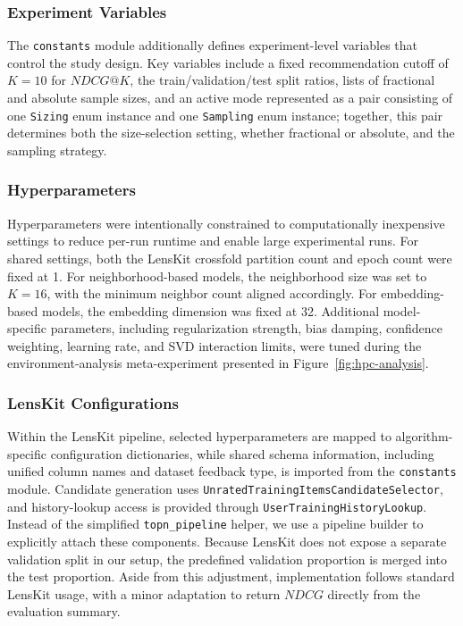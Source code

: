 \documentclass[12pt,a4paper]{article}
\begin{document}
\subsubsection{Experiment Variables}
The \texttt{constants} module additionally defines experiment-level variables that control the study design. Key variables include a fixed recommendation cutoff of $K=10$ for $NDCG@K$, the train/validation/test split ratios, lists of fractional and absolute sample sizes, and an active mode represented as a pair consisting of one \texttt{Sizing} enum instance and one \texttt{Sampling} enum instance; together, this pair determines both the size-selection setting, whether fractional or absolute, and the sampling strategy.

\subsubsection{Hyperparameters}
Hyperparameters were intentionally constrained to computationally inexpensive settings to reduce per-run runtime and enable large experimental runs. For shared settings, both the LensKit crossfold partition count and epoch count were fixed at 1. For neighborhood-based models, the neighborhood size was set to $K=16$, with the minimum neighbor count aligned accordingly. For embedding-based models, the embedding dimension was fixed at 32. Additional model-specific parameters, including regularization strength, bias damping, confidence weighting, learning rate, and SVD interaction limits, were tuned during the environment-analysis meta-experiment presented in Figure~\ref{fig:hpc-analysis}.

\subsubsection{LensKit Configurations}
Within the LensKit pipeline, selected hyperparameters are mapped to algorithm-specific configuration dictionaries, while shared schema information, including unified column names and dataset feedback type, is imported from the \texttt{constants} module. Candidate generation uses \texttt{UnratedTrainingItemsCandidateSelector}, and history-lookup access is provided through \texttt{UserTrainingHistoryLookup}. Instead of the simplified \texttt{topn\_pipeline} helper, we use a pipeline builder to explicitly attach these components. Because LensKit does not expose a separate validation split in our setup, the predefined validation proportion is merged into the test proportion. Aside from this adjustment, implementation follows standard LensKit usage, with a minor adaptation to return $NDCG$ directly from the evaluation summary.
\end{document}
